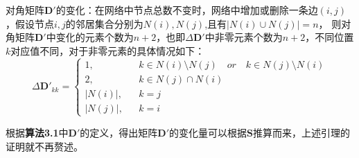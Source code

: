 \begin{lemma}
	{对角矩阵$\textbf{D}'$的变化}：在网络中节点总数不变时，网络中增加或删除一条边$(i,j)$，假设节点$i,j$的邻居集合分别为$N(i), N(j)$,且有$|N(i) \cup N(j)|=n$， 则对角矩阵$\textbf{D}'$中变化的元素个数为$n+2$，也即$\Delta\textbf{D}'$中非零元素个数为$n+2$，不同位置$k$对应值不同，对于非零元素的具体情况如下：
	\begin{equation}
		\Delta\textbf{D}'_{kk}=\left\{
		\begin{array}{ccl}
		1 ,      &      & k\in N(i)\setminus N(j)\quad or\quad  k\in N(j)\setminus N(i)\\
		2 ,    &      & k\in N(j) \cap N(i)\\
		|N(i)|,     &      & k=j\\
		|N(j)| ,      &      & k=i 
		\end{array} \right.
	\end{equation}
\end{lemma}
根据\textbf{算法3.1}中$\textbf{D}'$的定义，得出矩阵$\textbf{D}'$的变化量可以根据$\textbf{S}$推算而来，上述引理的证明就不再赘述。


